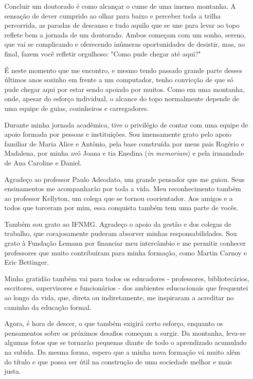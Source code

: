\begin{agradecimentos}
Concluir um doutorado é como alcançar o cume de uma imensa montanha. A sensação de dever cumprido ao olhar para baixo e perceber toda a trilha percorrida, as paradas de descanso e tudo aquilo que se une para levar ao topo reflete bem a jornada de um doutorado. Ambos começam com um sonho, sereno, que vai se complicando e oferecendo inúmeras oportunidades de desistir, mas, ao final, fazem você refletir orgulhoso: "Como pude chegar até aqui?" 

É neste momento que me encontro, e mesmo tendo passado grande parte desses últimos anos sozinho em frente a um computador, tenho convicção de que só pude chegar aqui por estar sendo apoiado por muitos. Como em uma montanha, onde, apesar do esforço individual, o alcance do topo normalmente depende de uma equipe de guias, cozinheiros e carregadores. 

Durante minha jornada acadêmica, tive o privilégio de contar com uma equipe de apoio formada por pessoas e instituições. Sou imensamente grato pelo apoio familiar de Maria Alice e Antônio, pela base construída por meus pais Rogério e Madalena, por minha avó Joana e tia Enedina (\textit{in memoriam}) e pela irmandade de Ana Caroline e Daniel.

Agradeço ao professor Paulo Adeodato, um grande pensador que me guiou. Seus ensinamentos me acompanharão por toda a vida. Meu reconhecimento também ao professor Kellyton, um colega que se tornou coorientador. Aos amigos e a todos que torceram por mim, essa conquista também tem uma parte de vocês.

Também sou grato ao IFNMG. Agradeço o apoio da gestão e dos colegas de trabalho, que corajosamente puderam absorver minhas responsabilidades. Sou grato à Fundação Lemann por financiar meu intercâmbio e me permitir conhecer professores que muito contribuíram para minha formação, como Martin Carnoy e Eric Bettinger. 

Minha gratidão também vai para todos os educadores - professores, bibliotecários, escritores, supervisores e funcionários - dos ambientes educacionais que frequentei ao longo da vida, que, direta ou indiretamente, me inspiraram a acreditar no caminho da educação formal. 

Agora, é hora de descer, o que também exigirá certo esforço, enquanto os pensamentos sobre os próximos desafios começam a surgir. Da montanha, leva-se algumas fotos que se tornarão pequenas diante de todo o aprendizado acumulado na subida. Da mesma forma, espero que a minha nova formação vá muito além do título e que possa ser útil na construção de uma sociedade melhor e mais justa.

\end{agradecimentos}
